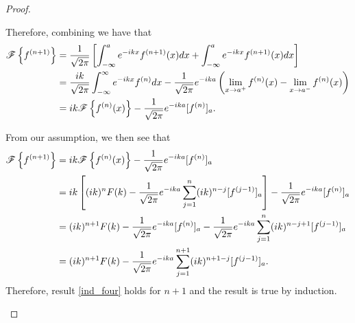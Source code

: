 \begin{proof}
\begin{enumerate}
      Therefore, combining we have that
      \begin{align*}
        \mathscr{F}\left\{ {f^{(n+1)}} \right\}
        &= \frac{1}{\sqrt{2\pi}}\left[\int_{-\infty}^{a}e^{-ikx}f^{(n+1)}(x)dx + \int_{-\infty}^{a}e^{-ikx}f^{(n+1)}(x)dx\right] \\
        &= \frac{ik}{\sqrt{2\pi}}\int_{-\infty}^{\infty}e^{-ikx}f^{(n)}dx - \frac{1}{\sqrt{2\pi}}e^{-ika}\left(\lim_{x\to a^{+}}f^{(n)}(x) - \lim_{x\to a^{-}}f^{(n)}(x)\right) \\
        &= ik \mathscr{F}\left\{ {f^{(n)}(x)} \right\} - \frac{1}{\sqrt{2\pi}}e^{-ika}[f^{(n)}]_a.
      \end{align*}

      From our assumption, we then see that
      \begin{align*}
        \mathscr{F}\left\{ {f^{(n+1)}} \right\} &= ik \mathscr{F}\left\{ {f^{(n)}(x)} \right\} - \frac{1}{\sqrt{2\pi}}e^{-ika}[f^{(n)}]_a \\
        &= ik \left[(ik)^n F(k) - \frac{1}{\sqrt{2\pi}}e^{-ika}\sum_{j=1}^{n} (ik)^{n-j} [f^{(j-1)}]_a\right] - \frac{1}{\sqrt{2\pi}}e^{-ika}[f^{(n)}]_a \\
        &= (ik)^{n+1}F(k) - \frac{1}{\sqrt{2\pi}}e^{-ika}[f^{(n)}]_a - \frac{1}{\sqrt{2\pi}}e^{-ika}\sum_{j=1}^{n} (ik)^{n-j+1} [f^{(j-1)}]_a  \\
        &= (ik)^{n+1}F(k) - \frac{1}{\sqrt{2\pi}}e^{-ika}\sum_{j=1}^{n+1} (ik)^{n+1-j} [f^{(j-1)}]_a .
      \end{align*}
      Therefore, result \eqref{ind_four} holds for $n+1$ and the result is true by induction.
  \end{enumerate}
\end{proof}
\newpage
